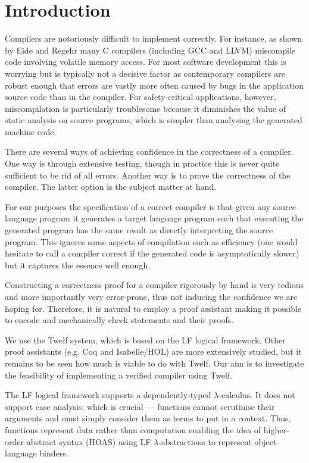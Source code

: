 \section{Introduction}

Compilers are notoriously difficult to implement correctly.
For instance, as shown by Eide and Regehr \cite{EideRegehr08} many C compilers (including GCC and LLVM) miscompile code involving volatile memory access.
For most software development this is worrying but is typically not a decisive factor as contemporary compilers are robust enough that errors are vastly more often caused by bugs in the application source code than in the compiler.
For safety-critical applications, however, miscompilation is particularly troublesome because it diminishes the value of static analysis on source programs, which is simpler than analysing the generated machine code.

There are several ways of achieving confidence in the correctness of a compiler.
One way is through extensive testing, though in practice this is never quite sufficient to be rid of all errors.
Another way is to prove the correctness of the compiler.
The latter option is the subject matter at hand.

For our purposes the specification of a correct compiler is that given any source language program it generates a target language program such that executing the generated program has the same result as directly interpreting the source program.
This ignores some aspects of compilation such as efficiency (one would hesitate to call a compiler correct if the generated code is asymptotically slower) but it captures the essence well enough.

Constructing a correctness proof for a compiler rigorously by hand is very tedious and more importantly very error-prone, thus not inducing the confidence we are hoping for.
Therefore, it is natural to employ a proof assistant making it possible to encode and mechanically check statements and their proofs.

We use the Twelf system, which is based on the LF logical framework.
Other proof assistants (e.g. Coq and Isabelle/HOL) are more extensively studied, but it remains to be seen how much is viable to do with Twelf.
Our aim is to investigate the feasibility of implementing a verified compiler using Twelf.

The LF logical framework \cite{HarperHonsellPlotkin93} supports a dependently-typed $\lambda$-calculus.
It does not support case analysis, which is crucial --- functions cannot scrutinise their arguments and must simply consider them as terms to put in a context.
Thus, functions represent data rather than computation enabling the idea of higher-order abstract syntax (HOAS) using LF $\lambda$-abstractions to represent object-language binders.

